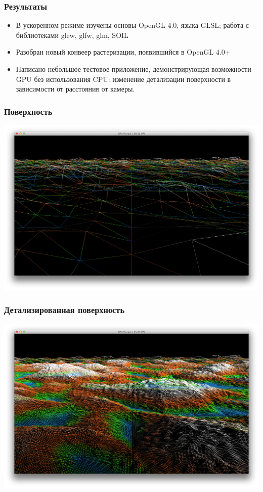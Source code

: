 \documentclass{beamer}
\begin{document}
    \begin{frame}\frametitle{Результаты}
        \begin{itemize}%
            \item	В ускоренном режиме изучены основы OpenGL 4.0, языка GLSL; работа с библиотеками glew, glfw, glm, SOIL
            \item	Разобран новый конвеер растеризации, появившийся в OpenGL 4.0+
            \item	Написано небольшое тестовое приложение, демонстрирующая возможности GPU без использования CPU: изменение детализации поверхности в зависимости от расстояния от камеры.
        \end{itemize}
    \end{frame}

    \begin{frame}\frametitle{Поверхность}
        \begin{center}
        	\includegraphics[scale=0.22]{1.png}\\
        \end{center}
    \end{frame}
    
    \begin{frame}\frametitle{Детализированная поверхность}
        \begin{center}
            \includegraphics[scale=0.22]{2.png}\\
        \end{center}
    \end{frame}
\end{document}
